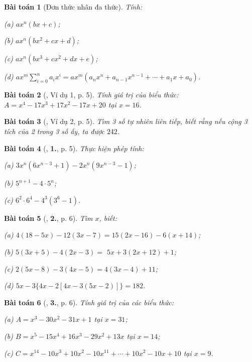 \documentclass{article}
\numberwithin{equation}{section}
\newtheorem{baitoan}{Bài toán}[section]
\begin{document}
\begin{baitoan}[Đơn thức nhân đa thức]
	Tính:
	\begin{enumerate*}
		\item[(a)] $ax^n(bx + c)$;
		\item[(b)] $ax^n(bx^2 + cx + d)$;
		\item[(c)] $ax^n(bx^3 + cx^2 + dx + e)$;
		\item[(d)] $ax^m\sum_{i=0}^n a_ix^i = ax^m(a_nx^n + a_{n-1}x^{n-1} + \cdots + a_1x + a_0)$.
	\end{enumerate*}
\end{baitoan}

\begin{baitoan}[\cite{Binh_Toan_8_tap_1}, Ví dụ 1, p. 5]
	Tính giá trị của biểu thức: $A = x^4 - 17x^3 + 17x^2 - 17x + 20$ tại $x = 16$.
\end{baitoan}

\begin{baitoan}[\cite{Binh_Toan_8_tap_1}, Ví dụ 2, p. 5]
	Tìm 3 số tự nhiên liên tiếp, biết rằng nếu cộng 3 tích của 2 trong 3 số ấy, ta được $242$.
\end{baitoan}

\begin{baitoan}[\cite{Binh_Toan_8_tap_1}, \textbf{1.}, p. 5]
	Thực hiện phép tính:
	\begin{enumerate*}
		\item[(a)] $3x^n(6x^{n-3} + 1) - 2x^n(9x^{n-3} - 1)$;
		\item[(b)] $5^{n+1} - 4\cdot 5^n$;
		\item[(c)] $6^2\cdot 6^4 - 4^3(3^6 - 1)$.
	\end{enumerate*}
\end{baitoan}

\begin{baitoan}[\cite{Binh_Toan_8_tap_1}, \textbf{2.}, p. 6]
	Tìm $x$, biết:
	\begin{enumerate*}
		\item[(a)] $4(18 - 5x) - 12(3x - 7) = 15(2x - 16) - 6(x + 14)$;
		\item[(b)] $5(3x + 5) - 4(2x - 3) =$ $5x + 3(2x + 12) + 1$;
		\item[(c)] $2(5x - 8) - 3(4x - 5) = 4(3x - 4) + 11$;
		\item[(d)] $5x - 3\{4x - 2[4x - 3(5x - 2)]\} = 182$.
	\end{enumerate*}
\end{baitoan}

\begin{baitoan}[\cite{Binh_Toan_8_tap_1}, \textbf{3.}, p. 6]
	Tính giá trị của các biểu thức:
	\begin{enumerate*}
		\item[(a)] $A = x^3 - 30x^2 - 31x + 1$ tại $x = 31$;
		\item[(b)] $B = x^5 - 15x^4 + 16x^3 - 29x^2 + 13x$ tại $x = 14$;
		\item[(c)] $C = x^{14} - 10x^3 + 10x^2 - 10x^{11} + \cdots + 10x^2 - 10x + 10$ tại $x = 9$.
	\end{enumerate*}
\end{baitoan}
\end{document}

